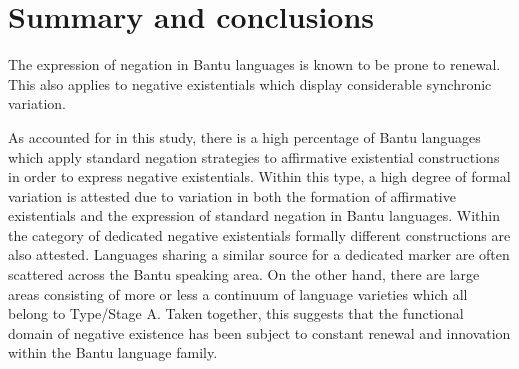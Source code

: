 \documentclass[output=paper]{langscibook}
\begin{document}
\section{Summary and conclusions}\label{sec:1:7}
%
The expression of negation in Bantu languages is known to be prone to renewal. This also applies to negative existentials which display considerable synchronic variation.

As accounted for in this study, there is a high percentage of Bantu
languages which apply standard negation strategies to affirmative
existential constructions in order to express negative existentials. Within
this type, a high degree of formal variation is attested due to variation
in both the formation of affirmative existentials and the expression of
standard negation in Bantu languages. Within the category of dedicated
negative existentials formally different constructions are also attested.
Languages sharing a similar source for a dedicated marker are often
scattered across the Bantu speaking area. On the other hand, there are
large areas consisting of more or less a continuum of language varieties
which all belong to Type\slash Stage A. Taken together, this suggests that the functional domain of negative existence has been subject to constant renewal and innovation within the Bantu language family.
\end{document}
